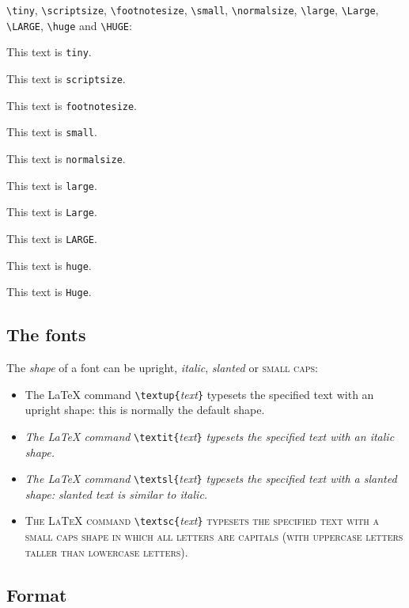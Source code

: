 \verb/\tiny/,
\verb/\scriptsize/,
\verb/\footnotesize/,
\verb/\small/,
\verb/\normalsize/,
\verb/\large/,
\verb/\Large/,
\verb/\LARGE/,
\verb/\huge/ and
\verb/\HUGE/:

\medskip

{\tiny This text is \texttt{tiny}}.

{\scriptsize This text is \texttt{scriptsize}}.

{\footnotesize This text is \texttt{footnotesize}}.

{\small This text is \texttt{small}}.

{\normalsize This text is \texttt{normalsize}}.

{\large This text is \texttt{large}}.

{\Large This text is \texttt{Large}}.

{\LARGE This text is \texttt{LARGE}}.

{\huge This text is \texttt{huge}}.

{\Huge This text is \texttt{Huge}}.


\subsection{The fonts}

The \emph{shape} of a font can be \textup{upright},
\textit{italic}, \textsl{slanted} or \textsc{small caps}:
\begin{itemize}
\item
\textup{The LaTeX command}
   \verb/\textup{/\emph{text}\verb/}/
   \textup{typesets the specified text with an upright shape:
   this is normally the default shape.}
\item
\textit{The LaTeX command}
   \verb/\textit{/\emph{text}\verb/}/
   \textit{typesets the specified text with an italic shape.}
\item
\textsl{The LaTeX command}
   \verb/\textsl{/\emph{text}\verb/}/
   \textsl{typesets the specified text with a slanted shape:
   slanted text is similar to italic.}
\item
\textsc{The LaTeX command}
   \verb/\textsc{/\emph{text}\verb/}/
   \textsc{typesets the specified text with a small caps shape
   in which all letters are capitals (with uppercase letters taller than
   lowercase letters).}
\end{itemize}


\pagebreak
\subsection{Format}

